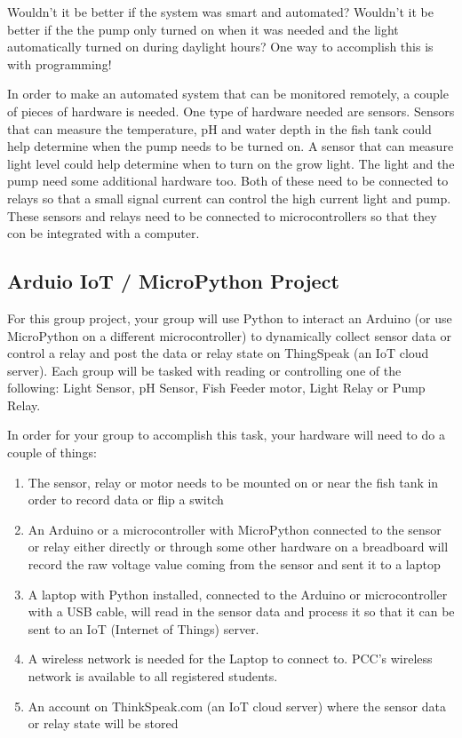 \documentclass[11pt]{article}
\providecommand{\tightlist}{%
      \setlength{\itemsep}{0pt}\setlength{\parskip}{0pt}}
\begin{document}
    Wouldn't it be better if the system was smart and automated? Wouldn't it
be better if the the pump only turned on when it was needed and the
light automatically turned on during daylight hours? One way to
accomplish this is with programming!

    In order to make an automated system that can be monitored remotely, a
couple of pieces of hardware is needed. One type of hardware needed are
sensors. Sensors that can measure the temperature, pH and water depth in
the fish tank could help determine when the pump needs to be turned on.
A sensor that can measure light level could help determine when to turn
on the grow light. The light and the pump need some additional hardware
too. Both of these need to be connected to relays so that a small signal
current can control the high current light and pump. These sensors and
relays need to be connected to microcontrollers so that they con be
integrated with a computer.

    \hypertarget{arduio-iot-micropython-project}{%
\subsection{Arduio IoT / MicroPython
Project}\label{arduio-iot-micropython-project}}

    For this group project, your group will use Python to interact an
Arduino (or use MicroPython on a different microcontroller) to
dynamically collect sensor data or control a relay and post the data or
relay state on ThingSpeak (an IoT cloud server). Each group will be
tasked with reading or controlling one of the following: Light Sensor,
pH Sensor, Fish Feeder motor, Light Relay or Pump Relay.

    In order for your group to accomplish this task, your hardware will need
to do a couple of things:

    \begin{enumerate}
\def\labelenumi{\arabic{enumi}.}
\tightlist
\item
  The sensor, relay or motor needs to be mounted on or near the fish
  tank in order to record data or flip a switch
\item
  An Arduino or a microcontroller with MicroPython connected to the
  sensor or relay either directly or through some other hardware on a
  breadboard will record the raw voltage value coming from the sensor
  and sent it to a laptop
\item
  A laptop with Python installed, connected to the Arduino or
  microcontroller with a USB cable, will read in the sensor data and
  process it so that it can be sent to an IoT (Internet of Things)
  server.
\item
  A wireless network is needed for the Laptop to connect to. PCC's
  wireless network is available to all registered students.
\item
  An account on ThinkSpeak.com (an IoT cloud server) where the sensor
  data or relay state will be stored
\end{enumerate}
\end{document}
